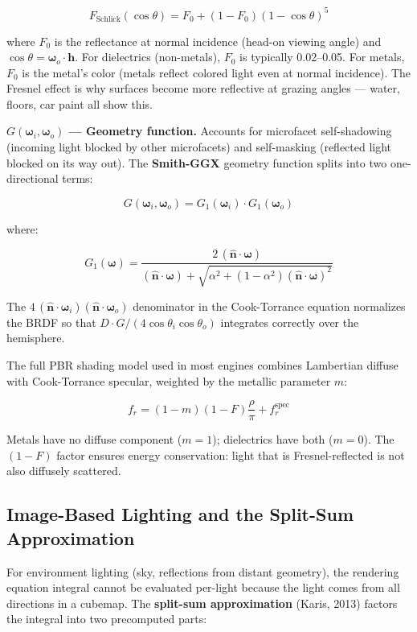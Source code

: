\documentclass[
  11pt,
  letterpaper,
  DIV=11,
  numbers=noendperiod,
  twoside,
  open=right]{scrreprt}
\begin{document}
\[
F_{\text{Schlick}}(\cos\theta) = F_0 + (1 - F_0)(1 - \cos\theta)^5
\]

where \(F_0\) is the reflectance at normal incidence (head-on viewing
angle) and \(\cos\theta = \boldsymbol{\omega}_o \cdot \mathbf{h}\). For
dielectrics (non-metals), \(F_0\) is typically 0.02--0.05. For metals,
\(F_0\) is the metal's color (metals reflect colored light even at
normal incidence). The Fresnel effect is why surfaces become more
reflective at grazing angles --- water, floors, car paint all show this.

\textbf{\(G(\boldsymbol{\omega}_i, \boldsymbol{\omega}_o)\) --- Geometry
function.} Accounts for microfacet self-shadowing (incoming light
blocked by other microfacets) and self-masking (reflected light blocked
on its way out). The \textbf{Smith-GGX} geometry function splits into
two one-directional terms:

\[
G(\boldsymbol{\omega}_i, \boldsymbol{\omega}_o) = G_1(\boldsymbol{\omega}_i) \cdot G_1(\boldsymbol{\omega}_o)
\]

where:

\[
G_1(\boldsymbol{\omega}) = \frac{2 \, (\hat{\mathbf{n}} \cdot \boldsymbol{\omega})}{(\hat{\mathbf{n}} \cdot \boldsymbol{\omega}) + \sqrt{\alpha^2 + (1 - \alpha^2)(\hat{\mathbf{n}} \cdot \boldsymbol{\omega})^2}}
\]

The
\(4 \, (\hat{\mathbf{n}} \cdot \boldsymbol{\omega}_i)(\hat{\mathbf{n}} \cdot \boldsymbol{\omega}_o)\)
denominator in the Cook-Torrance equation normalizes the BRDF so that
\(D \cdot G / (4 \cos\theta_i \cos\theta_o)\) integrates correctly over
the hemisphere.

The full PBR shading model used in most engines combines Lambertian
diffuse with Cook-Torrance specular, weighted by the metallic parameter
\(m\):

\[
f_r = (1 - m)(1 - F) \frac{\rho}{\pi} + f_r^{\text{spec}}
\]

Metals have no diffuse component (\(m = 1\)); dielectrics have both
(\(m = 0\)). The \((1 - F)\) factor ensures energy conservation: light
that is Fresnel-reflected is not also diffusely scattered.

\subsection{Image-Based Lighting and the Split-Sum
Approximation}\label{image-based-lighting-and-the-split-sum-approximation}

For environment lighting (sky, reflections from distant geometry), the
rendering equation integral cannot be evaluated per-light because the
light comes from all directions in a cubemap. The \textbf{split-sum
approximation} (Karis, 2013) factors the integral into two precomputed
parts:
\end{document}
